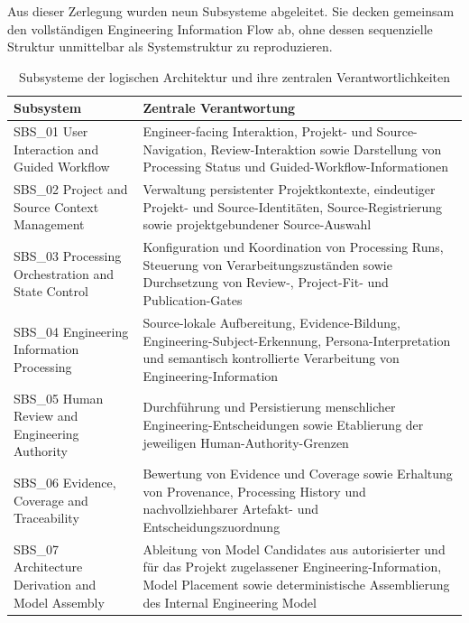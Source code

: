 Aus dieser Zerlegung wurden neun Subsysteme abgeleitet. Sie decken gemeinsam
den vollständigen Engineering Information Flow ab, ohne dessen sequenzielle
Struktur unmittelbar als Systemstruktur zu reproduzieren.

\begin{table}[htbp]
\caption{Subsysteme der logischen Architektur und ihre zentralen Verantwortlichkeiten}
\label{tab:subsystem_verantwortlichkeiten}
\centering
\small
\begin{tabular}{|p{4.8cm}|p{9.2cm}|}
\hline
\textbf{Subsystem} &
\textbf{Zentrale Verantwortung} \\
\hline

SBS\_01 User Interaction and Guided Workflow &
Engineer-facing Interaktion, Projekt- und Source-Navigation,
Review-Interaktion sowie Darstellung von Processing Status und
Guided-Workflow-Informationen \\
\hline

SBS\_02 Project and Source Context Management &
Verwaltung persistenter Projektkontexte, eindeutiger Projekt- und
Source-Identitäten, Source-Registrierung sowie projektgebundener
Source-Auswahl \\
\hline

SBS\_03 Processing Orchestration and State Control &
Konfiguration und Koordination von Processing Runs, Steuerung von
Verarbeitungszuständen sowie Durchsetzung von Review-, Project-Fit- und
Publication-Gates \\
\hline

SBS\_04 Engineering Information Processing &
Source-lokale Aufbereitung, Evidence-Bildung, Engineering-Subject-Erkennung,
Persona-Interpretation und semantisch kontrollierte Verarbeitung von
Engineering-Information \\
\hline

SBS\_05 Human Review and Engineering Authority &
Durchführung und Persistierung menschlicher Engineering-Entscheidungen sowie
Etablierung der jeweiligen Human-Authority-Grenzen \\
\hline

SBS\_06 Evidence, Coverage and Traceability &
Bewertung von Evidence und Coverage sowie Erhaltung von Provenance,
Processing History und nachvollziehbarer Artefakt- und
Entscheidungszuordnung \\
\hline

SBS\_07 Architecture Derivation and Model Assembly &
Ableitung von Model Candidates aus autorisierter und für das Projekt
zugelassener Engineering-Information, Model Placement sowie deterministische
Assemblierung des Internal Engineering Model \\
\hline


\end{tabular}
\end{table}
